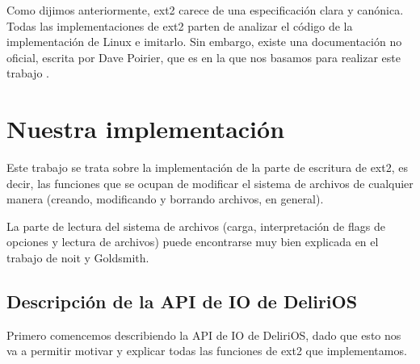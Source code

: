 Como dijimos anteriormente, ext2 carece de una especificación clara y canónica.
Todas las implementaciones de ext2 parten de analizar el código de la implementación de Linux e imitarlo.
Sin embargo, existe una documentación no oficial, escrita por Dave Poirier, que es en la que nos basamos para realizar este trabajo \cite{ext2doc}.

\section{Nuestra implementación}

Este trabajo se trata sobre la implementación de la parte de escritura de ext2, es decir, las funciones que se ocupan de modificar el sistema de archivos de cualquier manera (creando, modificando y borrando archivos, en general). 

La parte de lectura del sistema de archivos (carga, interpretación de flags de opciones y lectura de archivos) puede encontrarse muy bien explicada en el trabajo de noit y Goldsmith.

\subsection{Descripción de la API de IO de DeliriOS}

Primero comencemos describiendo la API de IO de DeliriOS, dado que esto nos va a permitir motivar y explicar todas las funciones de ext2 que implementamos.


